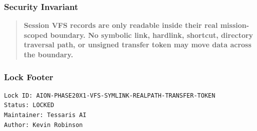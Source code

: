 \subsubsection{Security Invariant}

\begin{quote}
\textbf{Session VFS records are only readable inside their real mission-scoped boundary. No symbolic link, hardlink, shortcut, directory traversal path, or unsigned transfer token may move data across the boundary.}
\end{quote}

\subsubsection{Lock Footer}

\begin{verbatim}
Lock ID: AION-PHASE20X1-VFS-SYMLINK-REALPATH-TRANSFER-TOKEN
Status: LOCKED
Maintainer: Tessaris AI
Author: Kevin Robinson
\end{verbatim}
